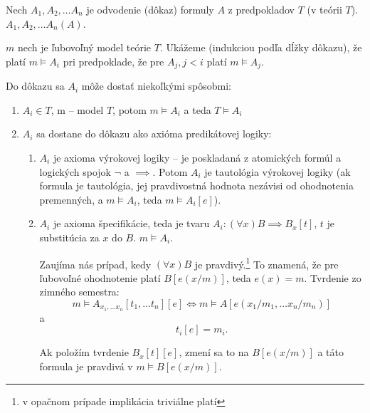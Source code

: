 \begin{dokaz}
    Nech $A_1, A_2, \ldots A_n$ je odvodenie (dôkaz) formuly $A$
    z predpokladov $T$ (v teórii $T$). $A_1, A_2, \ldots A_n(A)$. \fixme{}
    \par $m$ nech je ľubovoľný model teórie $T$.
    Ukážeme (indukciou podľa dĺžky dôkazu), že platí $m \models A_i$
    pri predpoklade, že pre $A_j, j < i$ platí $m \models A_j$.

    Do dôkazu sa $A_i$ môže dostať niekoľkými spôsobmi:
    \begin{enumerate}
	\item $A_i \in T$, m -- model $T$, potom $m \models A_i$ a teda
                $T \models A_i$
	\item $A_i$ sa dostane do dôkazu ako axióma predikátovej logiky:
	\begin{enumerate}
            \item $A_i$ je axioma výrokovej logiky -- je poskladaná z
            atomických formúl a logických spojok $\neg$ a $\implies$. Potom
            $A_i$ je tautológia výrokovej logiky (ak formula je tautológia,
            jej pravdivostná hodnota nezávisi od ohodnotenia premenných, a
            $m \models A_i$, teda $m \models A_i[e]$).
            
            \item $A_i$ je axioma špecifikácie, teda je tvaru $A_i: (\forall
            x) B \implies B_x[t]$, $t$ je substitúcia za $x$ do $B$. $m
            \models A_i$.
            \par
            Zaujíma nás prípad, kedy $(\forall x) B$ je pravdivý.\footnote{
                v opačnom prípade implikácia triviálne platí}
            To znamená, že pre ľubovoľné ohodnotenie platí $B[e(x/m)]$, teda
            $e(x)=m$. Tvrdenie zo zimného semestra: $$m \models A_{x_1,
            \ldots x_n}[t_1, \ldots t_n][e] \Leftrightarrow m \models
            A[e(x_1/m_1, \ldots x_n/m_n)]$$ a $$t_i[e] = m_i.$$ 

            Ak položím tvrdenie $B_x[t][e]$, zmení sa to na $B[e(x/m)]$ a
            táto formula je pravdivá v $m \models B[e(x/m)]$.


\end{enumerate}
\end{enumerate}
\end{dokaz}
